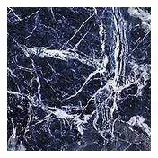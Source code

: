 \begin{figure}[]
\begin{subfigure}{\textwidth}
        \begin{subfigure}{0.19\textwidth}
            \centering
            \includegraphics[width=\textwidth]{images/04-experiment03/staircase_marble_target.jpg}
            \caption*{}
        \end{subfigure}
        \hfill
        \begin{subfigure}{0.19\textwidth}
            \centering
\end{subfigure}
\end{subfigure}
\end{figure}
